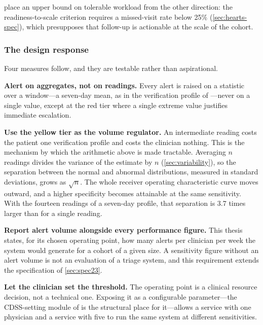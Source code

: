 \documentclass[12pt,a4paper,oneside]{report}
\begin{document}
\Textcite{who2023hypertension} place an upper bound on tolerable workload from the other direction: the readiness-to-scale criterion requires a missed-visit rate below 25\% (\cref{sec:hearts-spec}), which presupposes that follow-up is actionable at the scale of the cohort.

\subsubsection{The design response}\label{sec:volume-response}

Four measures follow, and they are testable rather than aspirational.

\textbf{Alert on aggregates, not on readings.} Every alert is raised on a statistic over a window---a seven-day mean, as in the verification profile of \textcite{mihevc2025}---never on a single value, except at the red tier where a single extreme value justifies immediate escalation.

\textbf{Use the yellow tier as the volume regulator.} An intermediate reading costs the patient one verification profile and costs the clinician nothing. This is the mechanism by which the arithmetic above is made tractable. Averaging $n$ readings divides the variance of the estimate by $n$ (\cref{sec:variability}), so the separation between the normal and abnormal distributions, measured in standard deviations, grows as $\sqrt{n}$. The whole receiver operating characteristic curve moves outward, and a higher specificity becomes attainable at the same sensitivity. With the fourteen readings of a seven-day profile, that separation is 3.7 times larger than for a single reading.

\textbf{Report alert volume alongside every performance figure.} This thesis states, for its chosen operating point, how many alerts per clinician per week the system would generate for a cohort of a given size. A sensitivity figure without an alert volume is not an evaluation of a triage system, and this requirement extends the specification of \cref{sec:spec23}.

\textbf{Let the clinician set the threshold.} The operating point is a clinical resource decision, not a technical one. Exposing it as a configurable parameter---the CDSS-setting module of \textcite{yazdani2018} is the structural place for it---allows a service with one physician and a service with five to run the same system at different sensitivities.

\end{document}
